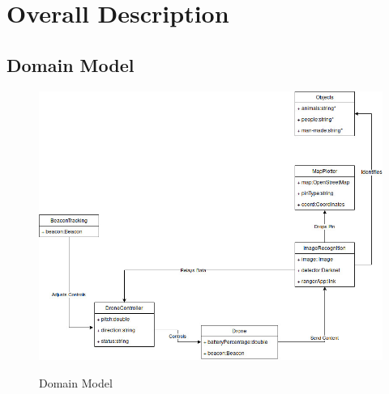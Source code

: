 \chapter{Overall Description}

\section{Domain Model}
\begin{figure}[h!]
	\includegraphics[width=\linewidth]{./assets/images/domain-model.jpg}
	\label{fig: Domain Model}
	\caption{Domain Model}
\end{figure}



